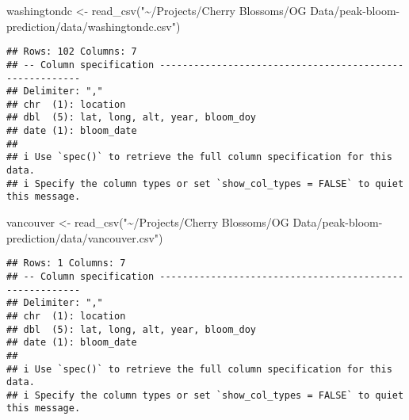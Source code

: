 \documentclass[
]{article}
\newenvironment{Shaded}{\begin{snugshade}}{\end{snugshade}}
\newcommand{\FunctionTok}[1]{\textcolor[rgb]{0.00,0.00,0.00}{#1}}
\newcommand{\NormalTok}[1]{#1}
\newcommand{\OtherTok}[1]{\textcolor[rgb]{0.56,0.35,0.01}{#1}}
\newcommand{\StringTok}[1]{\textcolor[rgb]{0.31,0.60,0.02}{#1}}
\begin{document}
\begin{Shaded}
\begin{Highlighting}[]
\NormalTok{washingtondc }\OtherTok{\textless{}{-}} \FunctionTok{read\_csv}\NormalTok{(}\StringTok{"\textasciitilde{}/Projects/Cherry Blossoms/OG Data/peak{-}bloom{-}prediction/data/washingtondc.csv"}\NormalTok{)}
\end{Highlighting}
\end{Shaded}

\begin{verbatim}
## Rows: 102 Columns: 7
## -- Column specification --------------------------------------------------------
## Delimiter: ","
## chr  (1): location
## dbl  (5): lat, long, alt, year, bloom_doy
## date (1): bloom_date
## 
## i Use `spec()` to retrieve the full column specification for this data.
## i Specify the column types or set `show_col_types = FALSE` to quiet this message.
\end{verbatim}

\begin{Shaded}
\begin{Highlighting}[]
\NormalTok{vancouver }\OtherTok{\textless{}{-}} \FunctionTok{read\_csv}\NormalTok{(}\StringTok{"\textasciitilde{}/Projects/Cherry Blossoms/OG Data/peak{-}bloom{-}prediction/data/vancouver.csv"}\NormalTok{)}
\end{Highlighting}
\end{Shaded}

\begin{verbatim}
## Rows: 1 Columns: 7
## -- Column specification --------------------------------------------------------
## Delimiter: ","
## chr  (1): location
## dbl  (5): lat, long, alt, year, bloom_doy
## date (1): bloom_date
## 
## i Use `spec()` to retrieve the full column specification for this data.
## i Specify the column types or set `show_col_types = FALSE` to quiet this message.
\end{verbatim}
\end{document}
